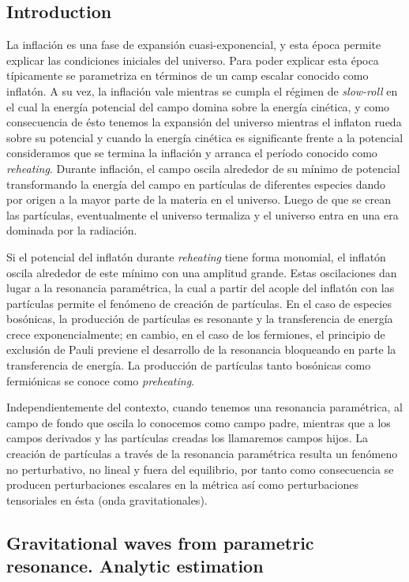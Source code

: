 \subsection{Introduction}

La inflación es una fase de expansión cuasi-exponencial, y esta época permite explicar las condiciones iniciales del universo. Para poder explicar esta época típicamente se parametriza en términos de un camp escalar conocido como inflatón. A su vez, la inflación vale mientras se cumpla el régimen de \textit{slow-roll} en el cual la energía potencial del campo domina sobre la energía cinética, y como consecuencia de ésto tenemos la expansión del universo mientras el inflaton rueda sobre su potencial y cuando la energía cinética es significante frente a la potencial consideramos que se termina la inflación y arranca el período conocido como \textit{reheating}. Durante inflación, el campo oscila alrededor de su mínimo de potencial transformando la energía del campo en partículas de diferentes especies dando por origen a la mayor parte de la materia en el universo. Luego de que se crean las partículas, eventualmente el universo termaliza y el universo entra en una era dominada por la radiación.

Si el potencial del inflatón durante \textit{reheating} tiene forma monomial, el inflatón oscila alrededor de este mínimo con una amplitud grande. Estas oscilaciones dan lugar a la resonancia paramétrica, la cual a partir del acople del inflatón con las partículas permite el fenómeno de creación de partículas. En el caso de especies bosónicas, la producción de partículas es resonante y la transferencia de energía crece exponencialmente; en cambio, en el caso de los fermiones, el principio de exclusión de Pauli previene el desarrollo de la resonancia bloqueando en parte la transferencia de energía. La producción de partículas tanto bosónicas como fermiónicas se conoce como \textit{preheating}.

Independientemente del contexto, cuando tenemos una resonancia paramétrica, al campo de fondo que oscila lo conocemos como campo padre, mientras que a los campos derivados y las partículas creadas los llamaremos campos hijos. La creación de partículas a través de la resonancia paramétrica resulta un fenómeno no perturbativo, no lineal y fuera del equilibrio, por tanto como consecuencia se producen perturbaciones escalares en la métrica así como perturbaciones tensoriales en ésta (onda gravitationales).

\subsection{Gravitational waves from parametric resonance. Analytic estimation}

